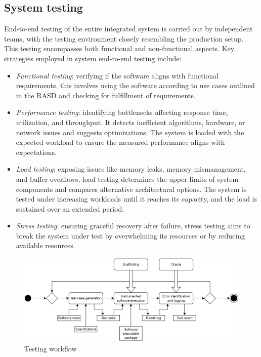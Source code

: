 \subsection{System testing}
End-to-end testing of the entire integrated system is carried out by independent teams, with the testing environment closely resembling the production setup. 
This testing encompasses both functional and non-functional aspects.
Key strategies employed in system end-to-end testing include:
\begin{itemize}
    \item \textit{Functional testing}: verifying if the software aligns with functional requirements, this involves using the software according to use cases outlined in the RASD and checking for fulfillment of requirements.
    \item \textit{Performance testing}: identifying bottlenecks affecting response time, utilization, and throughput.
        It detects inefficient algorithms, hardware, or network issues and suggests optimizations. 
        The system is loaded with the expected workload to ensure the measured performance aligns with expectations.
    \item \textit{Load testing}: exposing issues like memory leaks, memory mismanagement, and buffer overflows, load testing determines the upper limits of system components and compares alternative architectural options. 
        The system is tested under increasing workloads until it reaches its capacity, and the load is sustained over an extended period.
    \item \textit{Stress testing}: ensuring graceful recovery after failure, stress testing aims to break the system under test by overwhelming its resources or by reducing available resources.
\end{itemize}
\begin{figure}
    \centering
    \includegraphics[width=0.75\linewidth]{images/twf.png}
    \caption{Testing workflow}
\end{figure}

